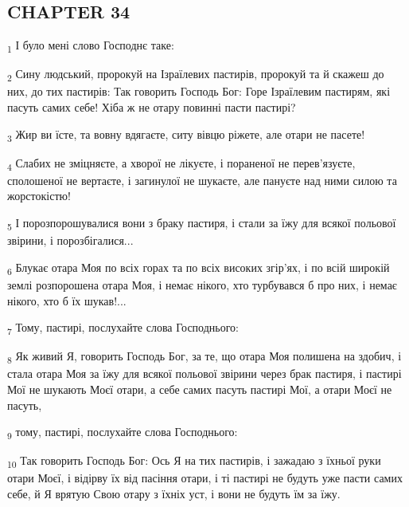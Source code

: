 \subsection{CHAPTER 34}
\begin{tcolorbox}
\textsubscript{1} І було мені слово Господнє таке:
\end{tcolorbox}
\begin{tcolorbox}
\textsubscript{2} Сину людський, пророкуй на Ізраїлевих пастирів, пророкуй та й скажеш до них, до тих пастирів: Так говорить Господь Бог: Горе Ізраїлевим пастирям, які пасуть самих себе! Хіба ж не отару повинні пасти пастирі?
\end{tcolorbox}
\begin{tcolorbox}
\textsubscript{3} Жир ви їсте, та вовну вдягаєте, ситу вівцю ріжете, але отари не пасете!
\end{tcolorbox}
\begin{tcolorbox}
\textsubscript{4} Слабих не зміцняєте, а хворої не лікуєте, і пораненої не перев'язуєте, сполошеної не вертаєте, і загинулої не шукаєте, але пануєте над ними силою та жорстокістю!
\end{tcolorbox}
\begin{tcolorbox}
\textsubscript{5} І порозпорошувалися вони з браку пастиря, і стали за їжу для всякої польової звірини, і порозбігалися...
\end{tcolorbox}
\begin{tcolorbox}
\textsubscript{6} Блукає отара Моя по всіх горах та по всіх високих згір'ях, і по всій широкій землі розпорошена отара Моя, і немає нікого, хто турбувався б про них, і немає нікого, хто б їх шукав!...
\end{tcolorbox}
\begin{tcolorbox}
\textsubscript{7} Тому, пастирі, послухайте слова Господнього:
\end{tcolorbox}
\begin{tcolorbox}
\textsubscript{8} Як живий Я, говорить Господь Бог, за те, що отара Моя полишена на здобич, і стала отара Моя за їжу для всякої польової звірини через брак пастиря, і пастирі Мої не шукають Моєї отари, а себе самих пасуть пастирі Мої, а отари Моєї не пасуть,
\end{tcolorbox}
\begin{tcolorbox}
\textsubscript{9} тому, пастирі, послухайте слова Господнього:
\end{tcolorbox}
\begin{tcolorbox}
\textsubscript{10} Так говорить Господь Бог: Ось Я на тих пастирів, і зажадаю з їхньої руки отари Моєї, і відірву їх від пасіння отари, і ті пастирі не будуть уже пасти самих себе, й Я врятую Свою отару з їхніх уст, і вони не будуть їм за їжу.
\end{tcolorbox}
